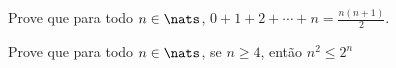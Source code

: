 \begin{exercise}
%
Prove que para todo $n \in\nats$, $0 + 1 + 2 + \dotsb + n = \frac {n(n+1)} 2$.
\end{exercise}

\begin{exercise}
%
Prove que para todo $n \in\nats$, se  $n \geq 4$, então $n^2 \leq 2^n$
\end{exercise}

